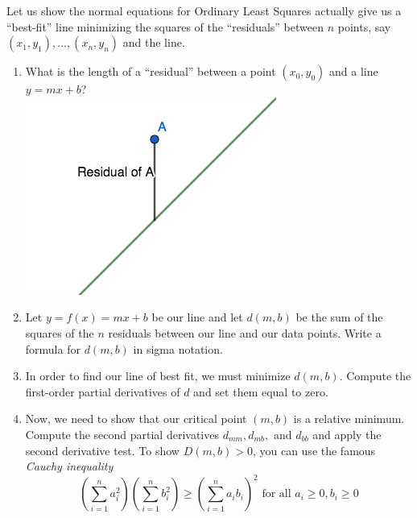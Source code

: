 \documentclass[12pt, a4paper]{article}
\begin{document}
\begin{ex}
  Let us show the normal equations for Ordinary Least Squares actually
  give us a ``best-fit'' line minimizing the squares of the
  ``residuals'' between 
  \(n\) points, say \((x_1,y_1), \ldots, (x_n, y_n)\) and the line.
  \begin{enumerate}
  \item What is the length of a ``residual'' between a point
    \((x_0,y_0)\) and a line 
    \(y=mx+b\)?\\
    \includegraphics[scale=0.5]{images/residual}
  \item Let \(y = f(x) = mx+b\) be our line and let \(d(m,b)\) be the
    sum of the squares of the \(n\) residuals between our line and our data
    points. Write a formula for \(d(m,b)\) in sigma notation.
    \vspace{1in}
  \item In order to find our line of best fit, we must minimize
    \(d(m,b)\). Compute the first-order partial derivatives of \(d\)
    and set them 
    equal to zero.
    \vspace{2in}
  \item Now, we need to show that our critical point \((m,b)\) is a relative
    minimum. Compute the second partial derivatives \(d_{mm}, d_{mb},\) and
    \(d_{bb}\) and apply the second derivative test. To show \(D(m,b)
    >0\), you can use the
    famous \emph{Cauchy inequality} \[
      \left( \sum_{i=1}^n a_i^2 \right) \left( \sum_{i=1}^n b_i^2 \right) \geq
      \left( \sum_{i=1}^n a_i b_i \right)^2 \text{ for all } a_i \geq 0, b_i
      \geq 0
    \]
  \end{enumerate}
\end{ex}
\end{document}
